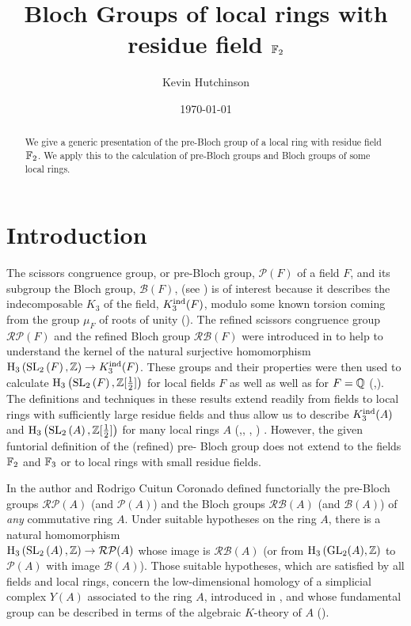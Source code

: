 \documentclass[12pt]{amsart}
\title{Bloch Groups of local rings with residue field $\F{2}$ }
\author{  Kevin Hutchinson}
\date{\today}
\theoremstyle{definition}
\newcommand{\Q}{\Bbb{Q}}
\newcommand{\F}[1]{\Bbb{F}_{#1}}
\newcommand{\Z}{\Bbb{Z}}
\newcommand{\spl}[2]{\operatorname{SL}_{#1}\left(#2\right)}
\newcommand{\gl}[2]{\mathrm{GL}_{#1}(#2)}
\newcommand{\pb}[1]{\mathcal{P}(#1)}%
\newcommand{\rpb}[1]{\mathcal{RP}(#1)}%
\newcommand{\bl}[1]{\mathcal{B}(#1)}%
\newcommand{\rbl}[1]{{\mathcal{RB}}(#1)}%
\newcommand{\<}{\langle}
\renewcommand{\>}{\rangle}
\newcommand{\kind}[1]{K^{\mathrm{\small ind}}_3(#1)}
\newcommand{\ho}[3]{\mathrm{H}_{#1}\left( #2,#3 \right)}
\begin{document}
%
\maketitle
\tableofcontents
\begin{abstract} We give a generic presentation of the pre-Bloch group of a local ring with residue field $\F{2}$. We apply this to the calculation of pre-Bloch groups and Bloch groups of some local rings.
\end{abstract}
\section{Introduction} 
The scissors congruence group, or pre-Bloch group, $\pb{F}$ of a field $F$, and its subgroup  the Bloch group, $\bl{F}$, (see \cite{sah:dupont}) is of interest because it describes the indecomposable $K_3$ of the field, $\kind{F}$,  modulo some known torsion coming from the group $\mu_F$ of roots of unity (\cite{sus:bloch}). 
 The refined scissors congruence group $\rpb{F}$  and the refined Bloch group $\rbl{F}$ were introduced in \cite{hut:cplx13} to help to understand the kernel of the natural 
surjective homomorphism $\ho{3}{\spl{2}{F}}{\Z}\to\kind{F}$. These groups and their properties were then used to calculate $\ho{3}{\spl{2}{F}}{\Z[\frac{1}{2}]}$ for local fields $F$ as well as well as for $F=\Q$ (\cite{hut:rbl11},\cite{hut:sl2Q}). The definitions and techniques in these results extend readily from fields to local rings with sufficiently large residue fields and thus allow us to describe $\kind{A}$ and $\ho{3}{\spl{2}{A}}{\Z[\frac{1}{2}]}$ for many local rings $A$ (\cite{mirzaii:bwlocal},\cite{hut:slr}, \cite{hut:mokarimirzaii}, \cite{mirzaii:perez25}) . 
However, the given funtorial definition of the (refined) pre- Bloch group does not extend to the fields $\F{2}$ and $\F{3}$ or to local rings with small residue fields.


In \cite{hut:bloch1} the author and  Rodrigo Cuitun Coronado defined functorially the pre-Bloch groups $\rpb{A}$ (and $\pb{A}$)  and the Bloch groups $\rbl{A}$ (and $\bl{A}$) of \emph{any} commutative ring $A$.   Under suitable hypotheses on the ring $A$, there is a natural homomorphism\\
 $\ho{3}{\spl{2}{A}}{\Z}\to \rpb{A}$ whose image is $\rbl{A}$ (or from $\ho{3}{\gl{2}{A}}{\Z}$ to $\pb{A}$ with image $\bl{A}$).  Those suitable hypotheses, which are satisfied by all fields and local rings, concern the low-dimensional homology of a simplicial complex $Y(A)$ associated to the ring $A$, introduced in \cite{hut:ge2}, and whose fundamental group can be described in terms of the algebraic $K$-theory of $A$ (\cite[Theorem 6.9]{hut:ge2}). 
\end{document}
